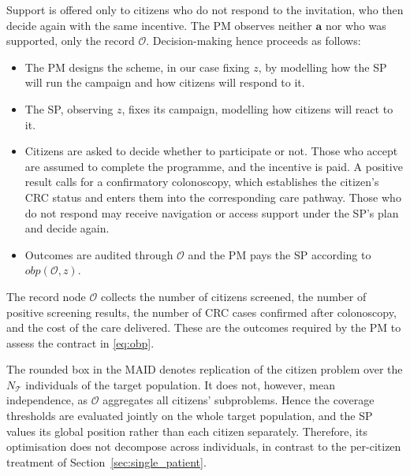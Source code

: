 \documentclass[12pt]{article}
\begin{document}
Support is offered only to citizens who do not respond to the invitation, who
then decide again with the same incentive. The PM observes neither
$\mathbf{a}$ nor who was supported, only the record $\mathcal{O}$. Decision-making hence proceeds as follows:
\begin{itemize}
    \item The PM designs the scheme, in our case fixing $z$, by modelling how the SP will run the campaign and how citizens will respond to it.

    \item The SP, observing $z$, fixes its campaign, modelling how citizens will react to it.

    \item Citizens are asked to decide whether to participate or not. Those who accept are assumed to complete the programme, and the incentive is paid. A positive result calls for a confirmatory colonoscopy, which establishes the citizen's CRC status and enters them into the corresponding care pathway. Those who do not respond may receive navigation or access support under the SP's plan and decide again.

    \item Outcomes are audited through $\mathcal{O}$ and the PM pays the SP according to $obp(\mathcal{O}, z)$.

\end{itemize}

The record node $\mathcal{O}$ collects the number of citizens screened, the number of positive screening results, the number of CRC cases confirmed after colonoscopy, and the cost of the care delivered. These are the outcomes required by the PM to assess the contract in \eqref{eq:obp}.

The rounded box in the MAID denotes replication of the citizen problem over the $N_{\mathcal{T}}$ individuals of the target population. It does not, however, mean independence, as $\mathcal{O}$ aggregates all citizens' subproblems. Hence the coverage thresholds are evaluated jointly on the whole target population, and the SP values its global position rather than each citizen separately. Therefore, its optimisation does not decompose across individuals, in contrast to the per-citizen treatment of Section~\ref{sec:single_patient}. 




\end{document}
